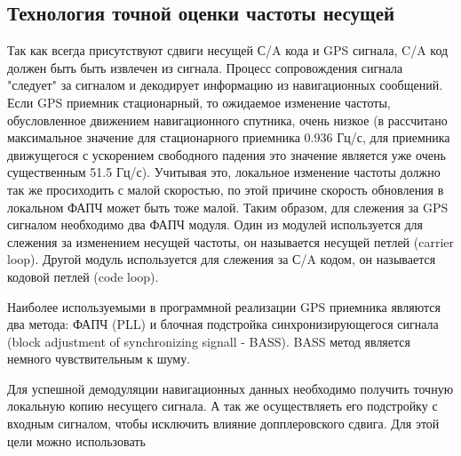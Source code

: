 \subsection{Технология точной оценки частоты несущей}
Так как всегда присутствуют сдвиги несущей С/A кода и GPS сигнала, C/A код должен быть быть извлечен из сигнала. Процесс сопровождения 
сигнала "следует" за сигналом и декодирует информацию из навигационных сообщений. Если GPS приемник стационарный, то ожидаемое
изменение частоты, обусловленное движением навигационного спутника, очень низкое (в \cite{tsui} рассчитано максимальное 
значение для стационарного
приемника 0.936 Гц/с, для приемника движущегося с ускорением свободного падения это значение является уже очень существенным 
51.5 Гц/с).
Учитывая это, локальное изменение частоты должно так же просиходить с малой скоростью, по этой причине скорость обновления в
локальном ФАПЧ может быть тоже малой. Таким образом, для слежения за GPS сигналом необходимо два ФАПЧ модуля. Один из модулей
используется для слежения за изменением несущей частоты, он называется несущей петлей (carrier loop). Другой модуль 
используется для слежения за С/A кодом, он называется кодовой петлей (code loop).

Наиболее используемыми в программной реализации GPS приемника являются два метода: ФАПЧ (PLL) и блочная подстройка синхронизирующегося
сигнала (block adjustment of synchronizing signall - BASS). BASS метод является немного чувствительным к шуму.

Для успешной демодуляции навигационных данных необходимо получить точную локальную копию несущего сигнала. А
так же осуществляеть его подстройку с входным сигналом, чтобы исключить влияние допплеровского сдвига. Для этой 
цели можно использовать


